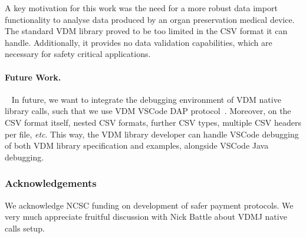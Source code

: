 \documentclass[runningheads,a4paper]{llncs}
\begin{document}
A key motivation for this work was the need for a more robust data import functionality to analyse data produced by an organ preservation medical device. The standard VDM library proved to be too limited in the CSV format it can handle. Additionally, it provides no data validation capabilities, which are necessary for safety critical applications. 

\paragraph*{Future Work.}~
%
In future, we want to integrate the debugging environment of VDM native library calls, such that we use VDM VSCode DAP protocol~\cite{AdvancedVSCodePaper}. Moreover, on the CSV format itself, nested CSV formats, further CSV types, multiple CSV headers per file, \textit{etc}. This way, the VDM library developer can handle VSCode debugging of both VDM library specification and examples, alongside VSCode Java debugging. 

\subsubsection*{Acknowledgements}
We acknowledge NCSC funding on development of safer payment protocols. We very much appreciate fruitful discussion with Nick Battle about VDMJ native calls setup. 




\end{document}
